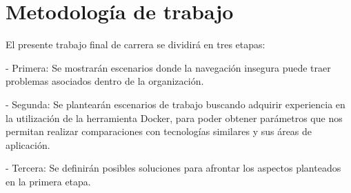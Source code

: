 \section{Metodología de trabajo}
\noindent El presente trabajo final de carrera se dividirá en tres etapas:

-	Primera: Se mostrarán escenarios donde la navegación insegura puede traer problemas 
asociados dentro de la organización. 

-	Segunda: Se plantearán escenarios de trabajo buscando adquirir experiencia en la 
utilización de la herramienta Docker, para poder obtener parámetros que nos permitan 
realizar comparaciones con tecnologías similares y sus áreas de aplicación.

-	Tercera: Se definirán posibles soluciones para afrontar 
los aspectos planteados en la primera etapa. 



